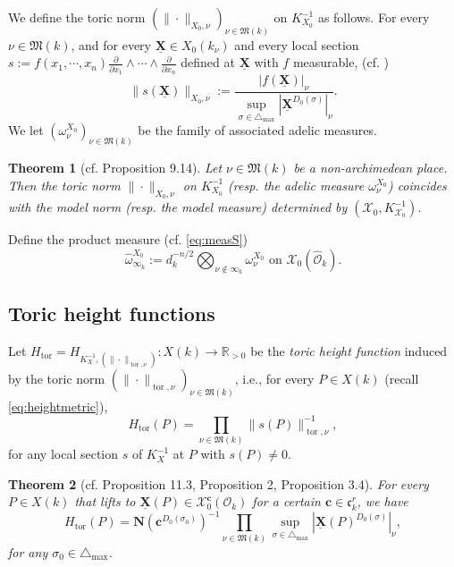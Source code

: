 \documentclass[11pt,letterpaper]{amsart}
\newcommand{\BR}{{\mathbb {R}}}
\newcommand{\CO}{{\mathcal {O}}}
\newcommand{\CX}{{\mathcal {X}}}
\newcommand{\XX}{\underline{\mathbf{X}}}
\theoremstyle{plain}
\numberwithin{equation}{section}
\newtheorem{theorem}{Theorem}[section]
\theoremstyle{definition}
\theoremstyle{remark}
\begin{document}
We define the toric norm $(\|\cdot\|_{X_0,\nu})_{\nu\in\mathfrak{M}(k)}$ on $K_{X_0}^{-1}$ as follows. For every $\nu\in\mathfrak{M}(k)$, and for every $\XX\in X_0(k_\nu)$ and every local section $s:=f(x_1,\cdots,x_n) \frac{\partial}{\partial x_{1}}\wedge\cdots\wedge\frac{\partial}{\partial x_{n}}$ defined at $\XX$ with $f$ measurable,  (cf. \cite[Theorem 9.12]{Salberger}) 
\begin{equation}\label{eq:normX0}
	\|s(\XX)\|_{X_0,\nu}:=\frac{|f(\XX)|_\nu}{\sup_{\sigma\in\triangle_{\max}}|\XX^{D_0(\sigma)}|_\nu}.
\end{equation}
We let $(\omega^{X_0}_{\nu})_{\nu\in\mathfrak{M}(k)}$ be the family of associated adelic measures.
\begin{theorem}[cf. \cite{Salberger} Proposition 9.14]\label{thm:nonarchTmeas}
	Let $\nu\in\mathfrak{M}(k)$ be a non-archimedean place. Then the toric norm $\|\cdot\|_{X_0,\nu}$ on $K_{X_0}^{-1}$ (resp. the adelic measure $\omega^{X_0}_{\nu}$) coincides with the model norm (resp. the model measure) determined by $(\CX_0,K^{-1}_{\CX_0})$.
\end{theorem}
Define the product measure (cf. \eqref{eq:measS}) \begin{equation}\label{eq:omegaXf}
	\widehat{\omega}_{\infty_k}^{X_0}:=d_k^{-n/2}\bigotimes_{\nu\notin \infty_k}\omega_\nu^{X_0}\text{ on }\CX_0(\widehat{\CO}_k).
\end{equation}



\subsection{Toric height functions}
Let $H_{\operatorname{tor}}=H_{K_X^{-1},(\|\cdot\|_{\operatorname{tor},\nu})}:X(k)\to\BR_{>0}$ be the \emph{toric height function} induced by the toric norm $(\|\cdot\|_{\operatorname{tor},\nu})_{\nu\in\mathfrak{M}(k)}$, i.e., for every $P\in X(k)$ (recall \eqref{eq:heightmetric}), 
\begin{equation}\label{eq:toricheight}
	H_{\operatorname{tor}}(P)=\prod_{\nu\in\mathfrak{M}(k)}\|s(P)\|^{-1}_{\operatorname{tor},\nu},
\end{equation} for any local section $s$ of $K_X^{-1}$ at $P$ with $s(P)\neq 0$. 

\begin{theorem}[cf. \cite{Salberger} Proposition 11.3, \cite{Pieropan} Proposition 2, \cite{Huang} Proposition 3.4]\label{thm:H0}
For every $P\in X(k)$ that lifts to $\XX(P)\in\CX_0^{\mathbf{c}}(\CO_k)$ for a certain $\mathbf{c}\in\mathfrak{c}_k^r$, we have	$$H_{\operatorname{tor}}(P)=\mathbf{N}(\mathbf{c}^{D_0(\sigma_0)})^{-1}\prod_{\nu\in\mathfrak{M}(k)}\sup_{\sigma\in\triangle_{\max}}|\XX(P)^{D_0(\sigma)}|_\nu,$$ for any $\sigma_0\in\triangle_{\max}$.
\end{theorem}
\end{document}
